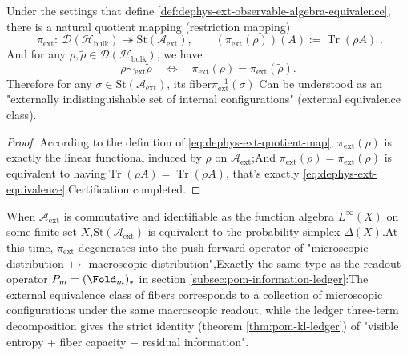 \begin{proposition} \label{prop:dephys-horizon-quotient-data-structure}Under the settings that define \ref{def:dephys-ext-observable-algebra-equivalence}, there is a natural quotient mapping (restriction mapping)\begin{equation}\label{eq:dephys-ext-quotient-map}
\boxed{\;
\pi_{\mathrm{ext}}:\ \mathcal{D}(\mathcal{H}_{\mathrm{bulk}})\twoheadrightarrow \mathrm{St}(\mathcal{A}_{\mathrm{ext}}),
\qquad
(\pi_{\mathrm{ext}}(\rho))(A):=\operatorname{Tr}(\rho A)\; }.
\end{equation}
And for any \(\rho,\tilde\rho\in\mathcal{D}(\mathcal{H}_{\mathrm{bulk}})\), we have\[
\boxed{\;
\rho\sim_{\mathrm{ext}}\tilde\rho
\quad\Longleftrightarrow\quad
\pi_{\mathrm{ext}}(\rho)=\pi_{\mathrm{ext}}(\tilde\rho).\;}
\]
Therefore for any \(\sigma\in \mathrm{St}(\mathcal{A}_{\mathrm{ext}})\), its fiber\(
\pi_{\mathrm{ext}}^{-1}(\sigma)
\)
Can be understood as an "externally indistinguishable set of internal configurations" (external equivalence class).\end{proposition}

\begin{proof}
According to the definition of \eqref{eq:dephys-ext-quotient-map}, \(\pi_{\mathrm{ext}}(\rho)\) is exactly the linear functional induced by \(\rho\) on \(\mathcal{A}_{\mathrm{ext}}\);And \(\pi_{\mathrm{ext}}(\rho)=\pi_{\mathrm{ext}}(\tilde\rho)\) is equivalent to having\(\operatorname{Tr}(\rho A)=\operatorname{Tr}(\tilde\rho A)\), that's exactly \eqref{eq:dephys-ext-equivalence}.Certification completed.\end{proof}

\begin{remark}\label{rem:dephys-ext-quotient-as-pushforward}When \(\mathcal{A}_{\mathrm{ext}}\) is commutative and identifiable as the function algebra \(L^\infty(X)\) on some finite set \(X\),\(\mathrm{St}(\mathcal{A}_{\mathrm{ext}})\) is equivalent to the probability simplex \(\Delta(X)\).At this time, \(\pi_{\mathrm{ext}}\) degenerates into the push-forward operator of "microscopic distribution \(\mapsto\) macroscopic distribution",Exactly the same type as the readout operator \(P_m=(\Fold_m)_*\) in section \ref{subsec:pom-information-ledger}:The external equivalence class of fibers corresponds to a collection of microscopic configurations under the same macroscopic readout, while the ledger three-term decomposition gives the strict identity (theorem \ref{thm:pom-kl-ledger}) of "visible entropy + fiber capacity \(-\) residual information".\end{remark}

